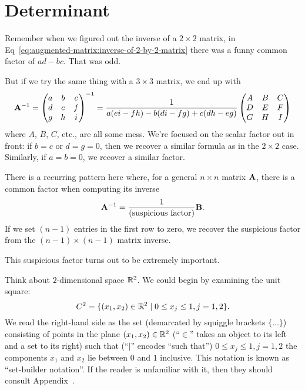\section{Determinant}

\M
Remember when we figured out the inverse of a $2\times 2$ matrix, in
Eq~\eqref{eq:augmented-matrix:inverse-of-2-by-2-matrix} there was a
funny common factor of $ad-bc$. That was odd.

But if we try the same thing with a $3\times 3$ matrix, we end up with
\begin{equation}
\mathbf{A}^{-1} = \begin{pmatrix}a & b & c\\
  d & e & f\\
  g & h & i
\end{pmatrix}^{-1} = \frac{1}{a(ei-fh)-b(di-fg)+c(dh-eg)}\begin{pmatrix}A & B & C\\
  D & E & F\\
  G & H & I
\end{pmatrix}
\end{equation}
where $A$, $B$, $C$, etc., are all some mess. We're focused on the
scalar factor out in front: if $b=c$ or $d=g=0$, then we recover a similar
formula as in the $2\times 2$ case. Similarly, if $a=b=0$, we recover a
similar factor.

There is a recurring pattern here where, for a general $n\times n$
matrix $\mathbf{A}$, there is a common factor when computing its inverse
\begin{equation}
\mathbf{A}^{-1} = \frac{1}{\mbox{(suspicious factor)}}\mathbf{B}.
\end{equation}
If we set $(n-1)$ entries in the first row to zero, we recover the
suspicious factor from the $(n-1)\times(n-1)$ matrix inverse.

This suspicious factor turns out to be extremely important.

Think about $2$-dimensional space $\mathbb{R}^{2}$. We could begin by examining
the unit square:
\begin{equation}
C^{2} = \{(x_{1},x_{2})\in\mathbb{R}^{2}\mid 0\leq x_{j}\leq 1, j=1,2\}.
\end{equation}
We read the right-hand side as the set (demarcated by squiggle brackets
$\{\dots\}$) consisting of points in the plane $(x_{1},x_{2})\in\mathbb{R}^{2}$
(``$\in$'' takes an object to its left and a set to its right) such that
(``$\mid$'' encodes ``such that'') $0\leq x_{j}\leq 1, j=1,2$ the
components $x_{1}$ and $x_{2}$ lie between $0$ and $1$ inclusive. This
notation is known as ``set-builder notation''. If the reader is
unfamiliar with it, then they should consult Appendix~\cite{section:appendix-sets}.

